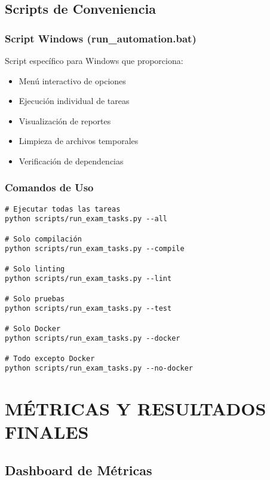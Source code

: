 \documentclass[12pt,a4paper]{article}
\begin{document}
\subsection{Scripts de Conveniencia}

\subsubsection{Script Windows (run\_automation.bat)}

Script específico para Windows que proporciona:

\begin{itemize}
    \item Menú interactivo de opciones
    \item Ejecución individual de tareas
    \item Visualización de reportes
    \item Limpieza de archivos temporales
    \item Verificación de dependencias
\end{itemize}

\subsubsection{Comandos de Uso}

\begin{verbatim}
# Ejecutar todas las tareas
python scripts/run_exam_tasks.py --all

# Solo compilación
python scripts/run_exam_tasks.py --compile

# Solo linting
python scripts/run_exam_tasks.py --lint

# Solo pruebas
python scripts/run_exam_tasks.py --test

# Solo Docker
python scripts/run_exam_tasks.py --docker

# Todo excepto Docker
python scripts/run_exam_tasks.py --no-docker
\end{verbatim}

\section{MÉTRICAS Y RESULTADOS FINALES}

\subsection{Dashboard de Métricas}
\end{document}

